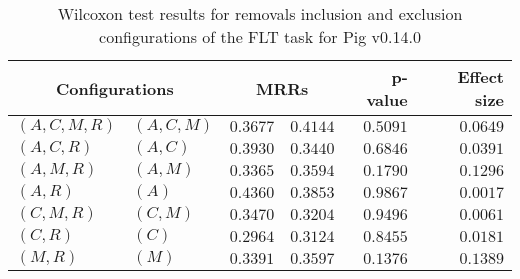 
\begin{table}
\begin{spacing}{1.2}
\centering
\caption{Wilcoxon test results for removals inclusion and exclusion configurations of the FLT task for Pig v0.14.0}
\label{table:versus-wilcox-pig-flt-removals}
\begin{tabular}{ll|rr|rr}
\toprule
      \multicolumn{2}{c|}{Configurations} &          \multicolumn{2}{c|}{MRRs} &       p-value & Effect size \\
\midrule
 $(A,C,M,R)$ &  $(A,C,M)$ & $0.3677$ & $0.4144$ & $0.5091$ &    $0.0649$ \\
   $(A,C,R)$ &    $(A,C)$ & $0.3930$ & $0.3440$ & $0.6846$ &    $0.0391$ \\
   $(A,M,R)$ &    $(A,M)$ & $0.3365$ & $0.3594$ & $0.1790$ &    $0.1296$ \\
     $(A,R)$ &      $(A)$ & $0.4360$ & $0.3853$ & $0.9867$ &    $0.0017$ \\
   $(C,M,R)$ &    $(C,M)$ & $0.3470$ & $0.3204$ & $0.9496$ &    $0.0061$ \\
     $(C,R)$ &      $(C)$ & $0.2964$ & $0.3124$ & $0.8455$ &    $0.0181$ \\
     $(M,R)$ &      $(M)$ & $0.3391$ & $0.3597$ & $0.1376$ &    $0.1389$ \\
\bottomrule
\end{tabular}

\end{spacing}
\end{table}

